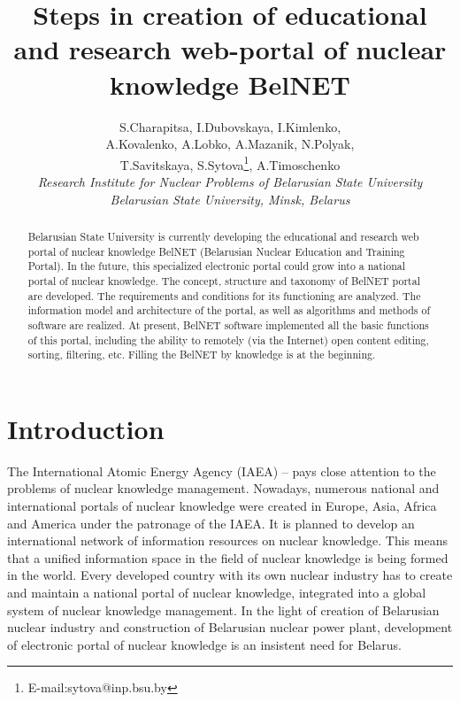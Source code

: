 \documentclass[12pt]{article}
\begin{document}
\title{Steps in creation of educational and research web-portal of nuclear knowledge BelNET}
\author{
S.Charapitsa{}, I.Dubovskaya{}, I.Kimlenko{}, \\
A.Kovalenko{}, A.Lobko{}, A.Mazanik{}, N.Polyak{}, \\
T.Savitskaya{}, S.Sytova{}\thanks{E-mail:sytova@inp.bsu.by}, A.Timoschenko{}\\
{\small \it {}Research Institute for Nuclear Problems of Belarusian State University}\\
{\small \it {}Belarusian State University, Minsk, Belarus}}
\date{}
\maketitle

\begin{abstract}
Belarusian State University is currently developing the
educational and research web portal of nuclear knowledge BelNET
(Belarusian Nuclear Education and Training Portal). In the future,
this specialized electronic portal could grow into a national
portal of nuclear knowledge. The concept, structure and taxonomy
of BelNET portal are developed. The requirements and conditions
for its functioning are analyzed. The information model and
architecture of the portal, as well as algorithms and methods of
software are realized. At present, BelNET software implemented all
the basic functions of this portal, including the ability to
remotely (via the Internet) open content editing, sorting,
filtering, etc. Filling the BelNET by knowledge is at the
beginning.
\end{abstract}

\section {Introduction}
The International Atomic Energy Agency (IAEA)
\cite{IAEA1}--\cite{IAEA4} pays close attention to the problems of
nuclear knowledge management. Nowadays, numerous national and
international portals of nuclear knowledge were created in Europe,
Asia, Africa and America under the patronage of the IAEA. It is
planned to develop an international network of information
resources on nuclear knowledge. This means that a unified
information space in the field of nuclear knowledge is being
formed in the world. Every developed country with its own nuclear
industry has to create and maintain a national portal of nuclear
knowledge, integrated into a global system of nuclear knowledge
management. In the light of creation of Belarusian nuclear
industry and construction of Belarusian nuclear power plant,
development of electronic portal of nuclear knowledge is an
insistent need for Belarus.
\end{document}
